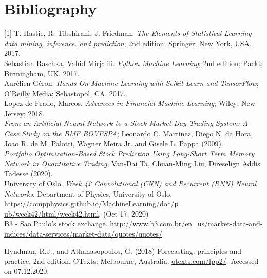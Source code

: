 \section{Bibliography}
\label{chap:Bibliography}

\label{Bib:T. Hastie, R. Tibshirani, J. Friedman}[1] T. Hastie, R. Tibshirani, J. Friedman. \textit{The Elements of Statistical Learning data mining, inference, and prediction}; 2nd edition; Springer; New York, USA. 2017.\\

\label{Bib:Sebastian Raschka, Vahid Mirjalili}\noindent [2] Sebastian Raschka, Vahid Mirjalili. \textit{Python Machine Learning}; 2nd edition; Packt; Birmingham, UK. 2017.\\

\label{Bib:Aurelien Geron}\noindent [3] Aurélien Géron. \textit{Hands-On Machine Learning with Scikit-Learn and TensorFlow}; O'Reilly Media; Sebastopol, CA. 2017.\\

\label{Bib:Lopez de Prado}\noindent [4] Lopez de Prado, Marcos. \textit{Advances in Financial Machine Learning}; Wiley; New Jersey; 2018.\\

\label{Bib:Leonardo C. Martinez, Diego N. da Hora, Joao R. de M. Palotti, Wagner Meira Jr. and Gisele L. Pappa}\noindent [5] \textit{From an Artificial Neural Network to a Stock Market Day-Trading System: A Case Study on the BMF BOVESPA}; Leonardo C. Martinez, Diego N. da Hora, Joao R. de M. Palotti, Wagner Meira Jr. and Gisele L. Pappa (2009).\\

\label{Bib:Van-Dai Ta, Chuan-Ming Liu, Direselign Addis Tadesse}\noindent [6] \textit{Portfolio Optimization-Based Stock Prediction Using
Long-Short Term Memory Network in Quantitative
Trading}; Van-Dai Ta, Chuan-Ming Liu, Direselign Addis Tadesse (2020).\\

\label{Bib:Week42Notes}\noindent [7] University of Oslo. \textit{Week 42 Convolutional (CNN) and Recurrent (RNN) Neural Networks}. Department of Physics, University of Oslo. \href{https://compphysics.github.io/MachineLearning/doc/pub/week42/html/week42.html}{https://compphysics.github.io/MachineLearning/doc/p}
\href{https://compphysics.github.io/MachineLearning/doc/pub/week41/html/week41.html}{ub/week42/html/week42.html}. (Oct 17, 2020)\\

\label{Bib:b3 quotes}\noindent [8] B3 - Sao Paulo's stock exchange. \href{http://www.b3.com.br/en_us/market-data-and-indices/data-services/market-data/quotes/quotes/}{http://www.b3.com.br/en\_us/market-data-and-indices/data-services/market-data/quotes/quotes/}

\label{Bib:Hyndman, R.J., and Athanasopoulos, G.}\noindent [9] Hyndman, R.J., and Athanasopoulos, G. (2018) Forecasting: principles and practice, 2nd edition, OTexts: Melbourne, Australia. \href{https://otexts.com/fpp2/}{otexts.com/fpp2/}. Accessed on 07.12.2020.
